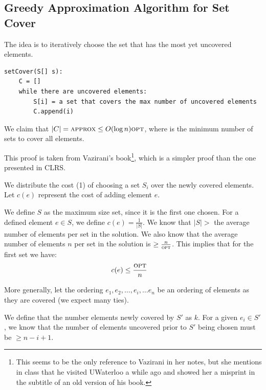                 \subsection{Greedy Approximation Algorithm for Set Cover} %
                \label{sub:greedy_approximation_algorithm_for_set_cover}
                    The idea is to iteratively choose the set that has the most yet uncovered elements.
                    \begin{lstlisting}
setCover(S[] s):
    C = []
    while there are uncovered elements:
        S[i] = a set that covers the max number of uncovered elements
        C.append(i)
                    \end{lstlisting}
                    We claim that $|C| = \textsc{approx} \le O(\log n) \textsc{opt}$, where \opt is the minimum number of sets to cover all elements.

                    This proof is taken from Vazirani's book\footnote{This seems to be the only reference to Vazirani in her notes, but she mentions in class that he visited UWaterloo a while ago and showed her a misprint in the subtitle of an old version of his book.}, which is a simpler proof than the one presented in CLRS.

                    We distribute the cost (1) of choosing a set $S_i$ over the newly covered elements.
                    Let $c(e)$ represent the cost of adding element $e$.

                    We define $S$ as the maximum size set, since it is the first one chosen.
                    For a defined element $e \in S$, we define $c(e) = \frac{1}{|S|}$.
                    We know that $|S| > $ the average number of elements per set in the \opt solution.
                    We also know that the average number of elements $n$ per set in the \opt solution is $\ge \frac{n}{\textsc{opt}}$.
                    This implies that for the first set we have:
                    \begin{align*}
                        c(e) &\le \frac{\textsc{opt}}{n}
                    \end{align*}

                    More generally, let the ordering $e_1, e_2, \ldots, e_i, \ldots e_n$ be an ordering of elements as they are covered (we expect many ties).

                    We define that the number elements newly covered by $S'$ as $k$.
                    For a given $e_i \in S'$, we know that the number of elements uncovered prior to $S'$ being chosen must be $\ge n - i + 1$.

